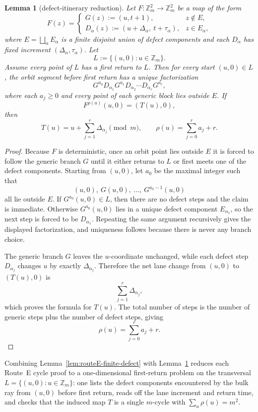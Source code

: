 \documentclass[11pt]{article}
\newtheorem{lemma}{Lemma}
\newcommand{\Zm}{\mathbb Z_m}
\begin{document}
\begin{lemma}[defect-itinerary reduction]\label{lem:routeE-itinerary}
Let $F:\Zm^2\to\Zm^2$ be a map of the form
\[
F(z)=
\begin{cases}
G(z):=(u,t+1), & z\notin E,\\
D_\alpha(z):=(u+\Delta_\alpha,\ t+\tau_\alpha), & z\in E_\alpha,
\end{cases}
\]
where $E=\bigsqcup_\alpha E_\alpha$ is a finite disjoint union of defect components and each $D_\alpha$ has fixed increment $(\Delta_\alpha,\tau_\alpha)$.
Let
\[
L:=\{(u,0):u\in\Zm\}.
\]
Assume every point of $L$ has a first return to $L$.
Then for every start $(u,0)\in L$, the orbit segment before first return has a unique factorization
\[
G^{a_0}D_{\alpha_1}G^{a_1}D_{\alpha_2}\cdots D_{\alpha_r}G^{a_r},
\]
where each $a_j\ge 0$ and every point of each generic block lies outside $E$.
If
\[
F^{\rho(u)}(u,0)=(T(u),0),
\]
then
\[
T(u)=u+\sum_{j=1}^r \Delta_{\alpha_j}\pmod m,
\qquad
\rho(u)=\sum_{j=0}^r a_j+r.
\]
\end{lemma}

\begin{proof}
Because $F$ is deterministic, once an orbit point lies outside $E$ it is forced to follow the generic branch $G$ until it either returns to $L$ or first meets one of the defect components.
Starting from $(u,0)$, let $a_0$ be the maximal integer such that
\[
(u,0),\ G(u,0),\ \dots,\ G^{a_0-1}(u,0)
\]
all lie outside $E$.
If $G^{a_0}(u,0)\in L$, then there are no defect steps and the claim is immediate.
Otherwise $G^{a_0}(u,0)$ lies in a unique defect component $E_{\alpha_1}$, so the next step is forced to be $D_{\alpha_1}$.
Repeating the same argument recursively gives the displayed factorization, and uniqueness follows because there is never any branch choice.

The generic branch $G$ leaves the $u$-coordinate unchanged, while each defect step $D_{\alpha_j}$ changes $u$ by exactly $\Delta_{\alpha_j}$.
Therefore the net lane change from $(u,0)$ to $(T(u),0)$ is
\[
\sum_{j=1}^r \Delta_{\alpha_j},
\]
which proves the formula for $T(u)$.
The total number of steps is the number of generic steps plus the number of defect steps, giving
\[
\rho(u)=\sum_{j=0}^r a_j+r.
\]
\end{proof}

Combining Lemma~\ref{lem:routeE-finite-defect} with Lemma~\ref{lem:routeE-itinerary} reduces each Route~E cycle proof to a one-dimensional first-return problem on the transversal $L=\{(u,0):u\in\Zm\}$: one lists the defect components encountered by the bulk ray from $(u,0)$ before first return, reads off the lane increment and return time, and checks that the induced map $T$ is a single $m$-cycle with $\sum_u\rho(u)=m^2$.
\end{document}
